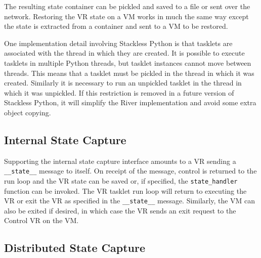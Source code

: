 The resulting state container can be pickled and saved to a file or sent over the network.  Restoring the VR state on a VM works in much the same way except the state is extracted from a container and sent to a VM to be restored.


One implementation detail involving Stackless Python is that tasklets are associated with the thread in which they are created.  It is possible to execute tasklets in multiple Python threads, but tasklet instances cannot move between threads.  This means that a tasklet must be pickled in the thread in which it was created.  Similarly it is necessary to run an unpickled tasklet in the thread in which it was unpickled.  If this restriction is removed in a future version of Stackless Python, it will simplify the River implementation and avoid some extra object copying.

\subsection{Internal State Capture}

Supporting the internal state capture interface amounts to a VR sending a
\verb+__state__+ message to itself.  On receipt of the message, control is
returned to the run loop and the VR state can be saved or, if specified,
the \verb+state_handler+ function can be invoked.  The VR tasklet run loop
will return to executing the VR or exit the VR as specified in the
\verb+__state__+ message.  Similarly, the VM can also be exited if desired,
in which case the VR sends an exit request to the Control VR on the VM.

\subsection{Distributed State Capture}

